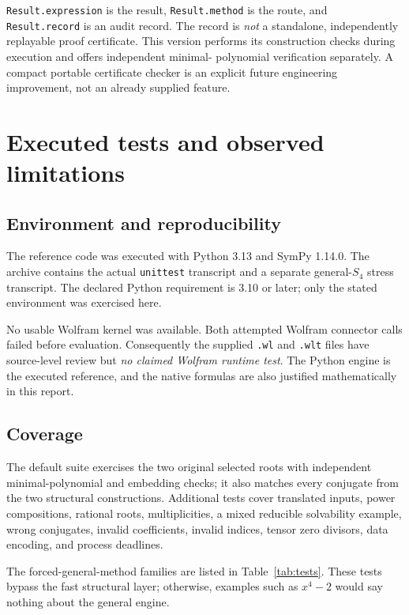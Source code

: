\documentclass[11pt]{article}
\theoremstyle{definition}\newtheorem{definition}[theorem]{Definition}
\theoremstyle{remark}\newtheorem{remark}[theorem]{Remark}
\newcommand{\code}[1]{\texttt{#1}}
\begin{document}
\code{Result.expression} is the result, \code{Result.method} is the route,
and \code{Result.record} is an audit record. The record is \emph{not} a
standalone, independently replayable proof certificate. This version performs
its construction checks during execution and offers independent minimal-
polynomial verification separately. A compact portable certificate checker is
an explicit future engineering improvement, not an already supplied feature.

\section{Executed tests and observed limitations}\label{sec:tests}

\subsection{Environment and reproducibility}

The reference code was executed with Python 3.13 and SymPy 1.14.0. The archive
contains the actual \code{unittest} transcript and a separate general-$S_4$
stress transcript. The declared Python requirement is 3.10 or later; only the
stated environment was exercised here.

No usable Wolfram kernel was available. Both attempted Wolfram connector calls
failed before evaluation. Consequently the supplied \code{.wl} and
\code{.wlt} files have source-level review but \emph{no claimed Wolfram runtime
test}. The Python engine is the executed reference, and the native formulas
are also justified mathematically in this report.

\subsection{Coverage}

The default suite exercises the two original selected roots with independent
minimal-polynomial and embedding checks; it also matches every conjugate from
the two structural constructions. Additional tests cover translated inputs,
power compositions, rational roots, multiplicities, a mixed reducible
solvability example, wrong conjugates, invalid coefficients, invalid indices,
tensor zero divisors, data encoding, and process deadlines.

The forced-general-method families are listed in Table~\ref{tab:tests}.
These tests bypass the fast structural layer; otherwise, examples such as
$x^4-2$ would say nothing about the general engine.
\end{document}
